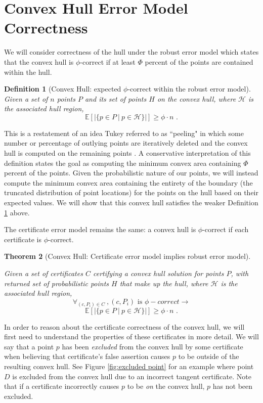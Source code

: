 \documentclass[11pt]{article}
\newtheorem{theorem}{\textbf{Theorem}}[section]
\newtheorem{definition}[theorem]{Definition}
\begin{document}
\section{Convex Hull Error Model Correctness}
\label{convex_hull_proof}
We will consider correctness of the hull under the robust error model which states that the convex hull is $\phi$-correct if at least $\Phi$ percent of the points are contained within the hull.  

\begin{definition}[Convex Hull: expected $\phi$-correct within the robust error model]
Given a set of $n$ points $P$ and its set of points $H$ on the convex hull, where $\mathcal{H}$ is the associated hull region,
\[ \mathbb{E} \left[ | \{ p \in P ~|~ p \in \mathcal{H} \} | \right] \geq \phi \cdot n \mbox { .} \]
\label{def:robust_convex}
\end{definition}

\noindent This is a restatement of an idea Tukey referred to as ``peeling" in which some number or percentage of outlying points are iteratively deleted and the convex hull is computed on the remaining points \cite{Huber72Robust}.  A conservative interpretation of this definition states the goal as computing the minimum convex area containing $\Phi$ percent of the points.  Given the probabilistic nature of our points, we will instead compute the minimum convex area containing the entirety of the boundary (the truncated distribution of point locations) for the points on the hull based on their expected values.  We will show that this convex hull satisfies the weaker Definition \ref{def:robust_convex} above.


The certificate error model remains the same: a convex hull is $\phi$-correct 
if each certificate is $\phi$-correct.

\newcommand{\thmConvexHull}{
Given a set of certificates $C$ certifying a convex hull solution for points $P$, with returned set of probabilistic points $H$ that make up the hull, where $\mathcal{H}$ is the associated hull region, 
\[ \forall_{(c,P_i) \in C}~, (c,P_i) \mbox{ is } \phi-correct
\longrightarrow\]
\[ \mathbb{E} \left[ | \{ p \in P ~|~ p \in \mathcal{H} \} | \right] \geq \phi \cdot n \mbox{ .} \]
}

\begin{theorem}[Convex Hull: Certificate error model implies robust error model]
\label{thm:convex_hull}
\thmConvexHull
\end{theorem}

In order to reason about the certificate correctness of the convex
hull, we will first need to understand the properties of these
certificates in more
detail.  
We will say that a point $p$ has been \emph{excluded} from the convex
hull by some certificate when believing that certificate's false
assertion causes $p$ to be outside of the resulting convex hull.  See
Figure \ref{fig:excluded point} for an example where point $D$ is
excluded from the convex hull due to an incorrect tangent
certificate. Note that if a certificate incorrectly causes $p$ to be
\emph{on} the convex hull, $p$ has not been excluded.
\end{document}
